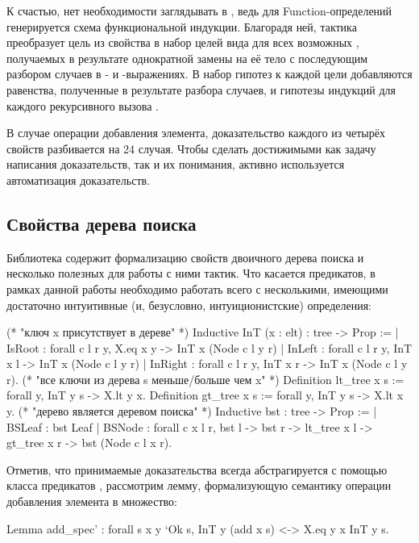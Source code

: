 \documentclass[a4paper,14pt]{extarticle}
\begin{document}
К счастью, нет необходимости заглядывать в ,
ведь для Function-определений генерируется схема
функциональной индукции.
Благорадя ней, тактика 
преобразует цель из свойства 
в набор целей вида  для
всех возможных ,
получаемых в результате однократной замены 
на её тело с последующим разбором случаев в
- и -выражениях.
В набор гипотез к каждой цели добавляются
равенства, полученные в результате разбора случаев,
и гипотезы индукций для каждого рекурсивного вызова .

В случае операции добавления элемента,
доказательство каждого из четырёх
свойств разбивается на 24 случая.
Чтобы сделать достижимыми как задачу написания доказательств,
так и их понимания,
активно используется автоматизация доказательств.

\subsection{Свойства дерева поиска}

Библиотека  содержит
формализацию свойств двоичного дерева поиска
и несколько полезных для работы с ними тактик.
Что касается предикатов, в рамках данной работы
необходимо работать всего с несколькими,
имеющими достаточно интуитивные (и, безусловно, интуиционистские)
определения:

\begin{coqcode}
(* "ключ x присутствует в дереве" *)
Inductive InT (x : elt) : tree -> Prop :=
  | IsRoot : forall c l r y, X.eq x y
     -> InT x (Node c l y r)
  | InLeft : forall c l r y, InT x l
     -> InT x (Node c l y r)
  | InRight : forall c l r y, InT x r
     -> InT x (Node c l y r).
(* "все ключи из дерева s меньше/больше чем x" *)
Definition lt_tree x s := forall y, InT y s -> X.lt y x.
Definition gt_tree x s := forall y, InT y s -> X.lt x y.
(* "дерево является деревом поиска" *)
Inductive bst : tree -> Prop :=
  | BSLeaf : bst Leaf
  | BSNode : forall c x l r, bst l -> bst r ->
     lt_tree x l -> gt_tree x r -> bst (Node c l x r).
\end{coqcode}

Отметив, что принимаемые доказательства 
всегда абстрагируется с помощью класса предикатов %
,
рассмотрим лемму, формализующую семантику операции
добавления элемента в множество:
\begin{coqcode}
Lemma add_spec' : forall s x y `{Ok s},
  InT y (add x s) <-> X.eq y x \/ InT y s.
\end{coqcode}
\end{document}
